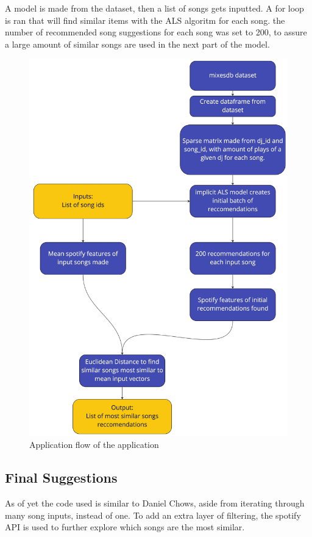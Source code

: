 A model is made from the dataset, then a list of songs gets inputted. A for loop is ran that will find similar items with the ALS algoritm for each song. the number of recommended song suggestions for each song was set to 200, to assure a large amount of similar songs are used in the next part of the model.

\begin{figure}[H]
	\includegraphics[scale=0.1]{images/application_app_flow}
	\centering
	\caption{Application flow of the application} 
\end{figure}

\subsection{Final Suggestions}
As of yet the code used is similar to Daniel Chows, aside from iterating through many song inputs, instead of one. To add an extra layer of filtering, the spotify API is used to further explore which songs are the most similar.

